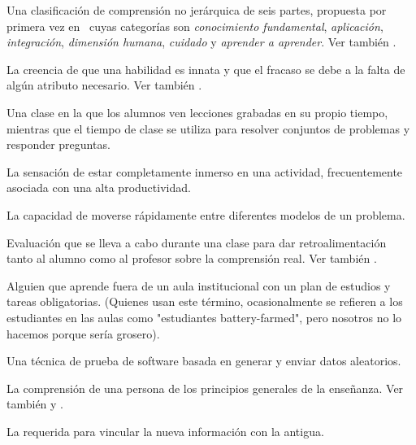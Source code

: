 \begin{description}
 Una clasificación de comprensión no jerárquica 
de seis partes, propuesta por primera vez en~\cite{Fink2013} cuyas categorías son \emph{conocimiento fundamental}, \emph{aplicación}, \emph{integración}, \emph{dimensión humana}, \emph{cuidado} y 
\emph{aprender a aprender}. Ver también .

 La creencia de que una habilidad es innata y que 
el fracaso se debe a la falta de algún atributo necesario. Ver también
.

 Una clase en la que los alumnos 
ven lecciones grabadas en su propio tiempo, mientras que el tiempo de clase 
se utiliza para resolver conjuntos de problemas y responder preguntas.

 La sensación de estar completamente inmerso en una actividad, 
frecuentemente asociada con una alta productividad.

 La capacidad de moverse
rápidamente entre diferentes modelos de un problema.

 Evaluación que se lleva a cabo 
durante una clase para dar retroalimentación tanto al alumno como al profesor 
sobre la comprensión real. Ver
también .

 Alguien que aprende fuera de un aula institucional con un plan de estudios y tareas obligatorias. (Quienes usan este término, ocasionalmente se refieren a los estudiantes en las aulas como "estudiantes battery-farmed", pero nosotros no lo hacemos porque sería grosero).

 Una técnica de prueba de software 
basada en generar y enviar datos aleatorios.

 La 
comprensión de una persona de los principios generales de la enseñanza. Ver también
y .

 La 
requerida para vincular la nueva información con la antigua.


\end{description}
